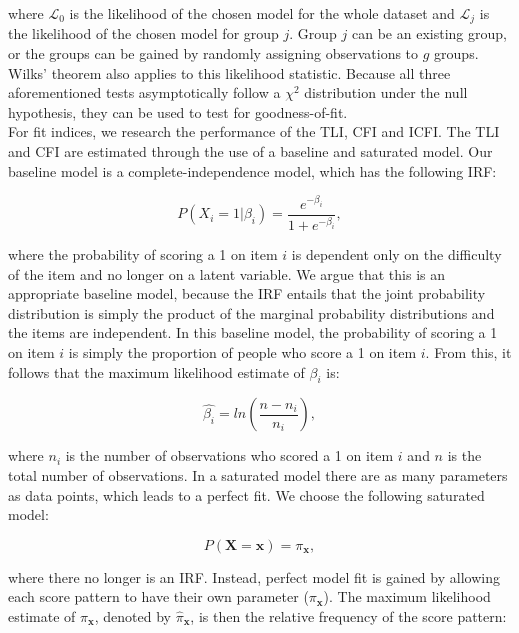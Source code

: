 \documentclass[Royal,sageapa,times,doublespace]{sagej}
\begin{document}
where $\mathcal{L}_0$ is the likelihood of the chosen model for the whole dataset and $\mathcal{L}_j$ is the likelihood of the chosen model for group $j$. Group $j$ can be an existing group, or the groups can be gained by randomly assigning observations to $g$ groups. Wilks' theorem also applies to this likelihood statistic. Because all three aforementioned tests asymptotically follow a $\chi^2$ distribution under the null hypothesis, they can be used to test for goodness-of-fit. \\
\indent For fit indices, we research the performance of the TLI, CFI and ICFI. The TLI and CFI are estimated through the use of a baseline and saturated model. Our baseline model is a complete-independence model, which has the following IRF:

\begin{equation}
P(X_i = 1 | \beta_{i}) = \frac{e^{- \beta_{i}}}{1 + e^{- \beta_{i}}},
\end{equation}

where the probability of scoring a 1 on item $i$ is dependent only on the difficulty of the item and no longer on a latent variable. We argue that this is an appropriate baseline model, because the IRF entails that the joint probability distribution is simply the product of the marginal probability distributions and the items are independent. In this baseline model, the probability of scoring a 1 on item $i$ is simply the proportion of people who score a 1 on item $i$. From this, it follows that the maximum likelihood estimate of $\beta_{i}$ is:

\begin{equation*}
\hat{\beta_{i}} = ln(\frac{n - n_i}{n_i}), 
\end{equation*}

where $n_i$ is the number of observations who scored a 1 on item $i$ and $n$ is the total number of observations. In a saturated model there are as many parameters as data points, which leads to a perfect fit. We choose the following saturated model:

\begin{equation}
P(\boldsymbol{X} = \boldsymbol{x}) = \pi_{\boldsymbol{x}},
\end{equation}

where there no longer is an IRF. Instead, perfect model fit is gained by allowing each score pattern to have their own parameter ($\pi_{\boldsymbol{x}}$). The maximum likelihood estimate of $\pi_{\boldsymbol{x}}$, denoted by $\hat{\pi}_{\boldsymbol{x}}$, is then the relative frequency of the score pattern:
\end{document}
